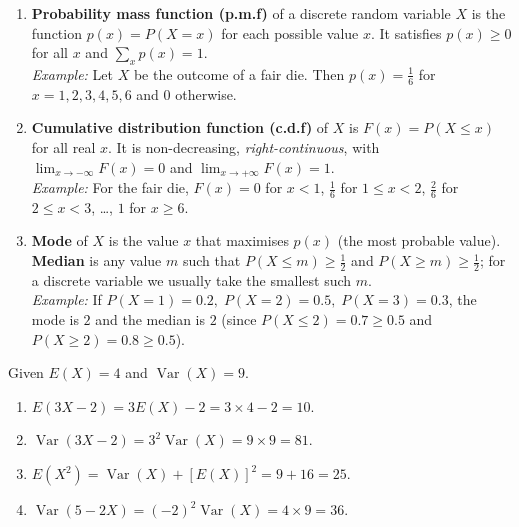 \documentclass[11pt]{article}
\begin{document}
\begin{corrige}
\begin{enumerate}
\item \textbf{Probability mass function (p.m.f)} of a discrete random variable \(X\) is the function \(p(x)=P(X=x)\) for each possible value \(x\). It satisfies \(p(x)\ge0\) for all \(x\) and \(\sum_x p(x)=1\).\\
\emph{Example:} Let \(X\) be the outcome of a fair die. Then \(p(x)=\frac16\) for \(x=1,2,3,4,5,6\) and \(0\) otherwise.
\item \textbf{Cumulative distribution function (c.d.f)} of \(X\) is \(F(x)=P(X\le x)\) for all real \(x\). It is non-decreasing, \emph{right-continuous}, with \(\lim_{x\to-\infty}F(x)=0\) and \(\lim_{x\to+\infty}F(x)=1\).\\
\emph{Example:} For the fair die, \(F(x)=0\) for \(x<1\), \(\frac16\) for \(1\le x<2\), \(\frac26\) for \(2\le x<3\), …, \(1\) for \(x\ge6\).
\item \textbf{Mode} of \(X\) is the value \(x\) that maximises \(p(x)\) (the most probable value). \textbf{Median} is any value \(m\) such that \(P(X\le m)\ge\frac12\) and \(P(X\ge m)\ge\frac12\); for a discrete variable we usually take the smallest such \(m\).\\
\emph{Example:} If \(P(X=1)=0.2,\;P(X=2)=0.5,\;P(X=3)=0.3\), the mode is \(2\) and the median is \(2\) (since \(P(X\le2)=0.7\ge0.5\) and \(P(X\ge2)=0.8\ge0.5\)).
\end{enumerate}
\end{corrige}

\begin{corrige}
Given \(E(X)=4\) and \(\operatorname{Var}(X)=9\).
\begin{enumerate}
\item \(E(3X-2)=3E(X)-2=3\times4-2=10\).
\item \(\operatorname{Var}(3X-2)=3^2\operatorname{Var}(X)=9\times9=81\).
\item \(E(X^2)=\operatorname{Var}(X)+[E(X)]^2=9+16=25\).
\item \(\operatorname{Var}(5-2X)=(-2)^2\operatorname{Var}(X)=4\times9=36\).
\end{enumerate}
\end{corrige}
\end{document}

